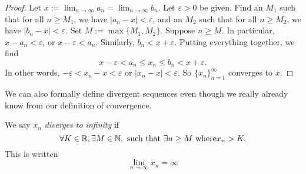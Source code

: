 \documentclass[../main.tex]{subfiles}
\begin{document}
    
    
    
    
    
    
    
    \begin{proof}
    Let \( x := \lim_{n\to\infty} a_n = \lim_{n\to\infty} b_n \). Let \( \varepsilon > 0 \) be given. Find an \( M_1 \) such that for all \( n \geq M_1 \), we have \( |a_n - x| < \varepsilon \), and an \( M_2 \) such that for all \( n \geq M_2 \), we have \( |b_n - x| < \varepsilon \). Set \( M := \max\{M_1, M_2\} \). Suppose \( n \geq M \). In particular, \( x - a_n < \varepsilon \), or \( x - \varepsilon < a_n \). Similarly, \( b_n < x + \varepsilon \). Putting everything together, we find
    \[
    x - \varepsilon < a_n \leq x_n \leq b_n < x + \varepsilon.
    \]
    In other words, \( -\varepsilon < x_n - x < \varepsilon \) or \( |x_n - x| < \varepsilon \). So \( \{x_n\}_{n=1}^{\infty} \) converges to \( x \).   
    \end{proof}
    
    
    
    
    
    
    
    
    
    
    
    
    
    
    
    
    
    
    
    We can also formally define divergent sequences even though we really already know from our definition of convergence.
    
    
    
    
    
    
    
    
    
    
    
    
    
    
    
    
    \begin{definition}\label{def:divergent sequence}
    We say \(x_n\) \textit{diverges to infinity} if
    \[
    \forall K \in \mathbb{R}, \exists M \in \mathbb{N}, \textnormal{ such that } \exists n \geq  M \textnormal{ where} x_n > K.
    \]
    This is written
    \[
    \lim_{n \to \infty}{x_n} = \infty
    \]
    \end{definition}
    
    
    
    
    
    
    
\end{document}

